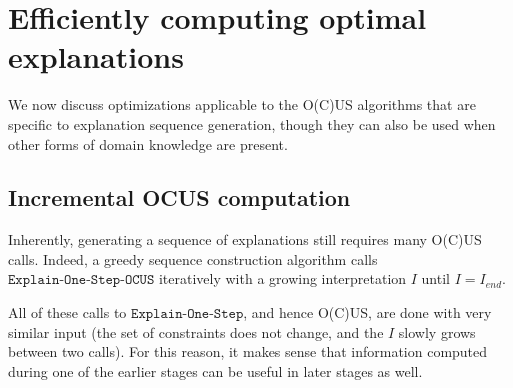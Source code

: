 \documentclass[a4paper,UKenglish,cleveref, autoref, thm-restate, pdfa]{lipics-v2021}
\newcommand\m[1]{\mathcal{#1}}
\newcommand\Iend{\ensuremath{I_\mathit{end} }\xspace}
\newcommand\formulac{\ensuremath{\m{C} }\xspace}
\newcommand\mm[1]{\ensuremath{#1}\xspace}
\newcommand\call[1]{\mm{\texttt{#1}}}
\newcommand\omus{\mm{\call{OUS}}}
\newcommand\onestep{\ensuremath{\call{Explain-One-Step}}\xspace}
\newcommand\onestepo{\ensuremath{\call{Explain-One-Step-OCUS}}\xspace}
\begin{document}
	\section{Efficiently computing optimal explanations}\label{sec:efficient-ocus}
	
	
	
	
	We now discuss optimizations applicable to the O(C)US algorithms that are specific to explanation sequence generation, though they can also be used when other forms of domain knowledge are present. 
	
	\subsection{Incremental OCUS computation}\label{sec:ocusEx}
	Inherently, generating a sequence of explanations still requires many O(C)US calls. 
	Indeed, a greedy sequence construction algorithm %
	calls \onestepo iteratively with a growing interpretation $I$ until $I=\Iend$.
	
	All of these calls to \onestep, and hence O(C)US, are done with very similar input (the set of constraints does not change, and the $I$ slowly grows between two calls). For this reason, it makes sense that information computed during one of the earlier stages can be useful in later stages as well. 
	
\end{document}
